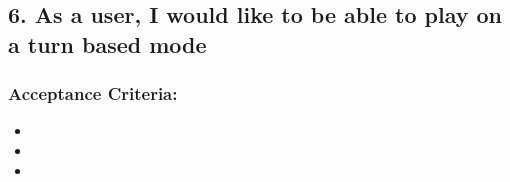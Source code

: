 \subsection*{6. As a user, I would like to be able to play on a turn based mode}


\subsubsection*{Acceptance Criteria:}

\begin{itemize}
\item 
\item 
\item 
\end{itemize}

